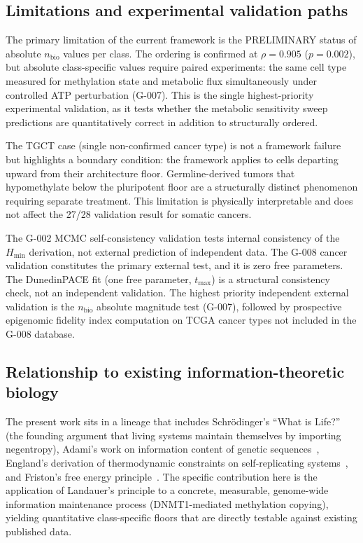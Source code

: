 \documentclass[12pt,a4paper]{article}
\newcommand{\Hmin}{H_{\min}}
\newcommand{\nbio}{n_{\mathrm{bio}}}
\begin{document}
\subsection{Limitations and experimental validation paths}
\label{sec:limitations}

The primary limitation of the current framework is the PRELIMINARY status of
absolute $\nbio$ values per class. The ordering is confirmed at $\rho = 0.905$
($p = 0.002$), but absolute class-specific values require paired experiments:
the same cell type measured for methylation state and metabolic flux
simultaneously under controlled ATP perturbation (G-007). This is the single
highest-priority experimental validation, as it tests whether the metabolic
sensitivity sweep predictions are quantitatively correct in addition to
structurally ordered.

The TGCT case (single non-confirmed cancer type) is not a framework failure
but highlights a boundary condition: the framework applies to cells departing
upward from their architecture floor. Germline-derived tumors that hypomethylate
below the pluripotent floor are a structurally distinct phenomenon requiring
separate treatment. This limitation is physically interpretable and does not
affect the 27/28 validation result for somatic cancers.

The G-002 MCMC self-consistency validation tests internal consistency of the
$\Hmin$ derivation, not external prediction of independent data. The G-008
cancer validation constitutes the primary external test, and it is zero
free parameters. The DunedinPACE fit (one free parameter, $t_{\max}$) is
a structural consistency check, not an independent validation. The highest
priority independent external validation is the $\nbio$ absolute magnitude
test (G-007), followed by prospective epigenomic fidelity index computation on TCGA cancer
types not included in the G-008 database.

\subsection{Relationship to existing information-theoretic biology}

The present work sits in a lineage that includes Schr\"{o}dinger's
``What is Life?''~\cite{Schrodinger1944} (the founding argument that living
systems maintain themselves by importing negentropy), Adami's work on
information content of genetic sequences~\cite{Adami2002},
England's derivation of thermodynamic constraints on self-replicating
systems~\cite{England2013}, and Friston's free energy
principle~\cite{Friston2010}. The specific contribution here is the
application of Landauer's principle to a concrete, measurable, genome-wide
information maintenance process (DNMT1-mediated methylation copying), yielding
quantitative class-specific floors that are directly testable against
existing published data.
\end{document}
